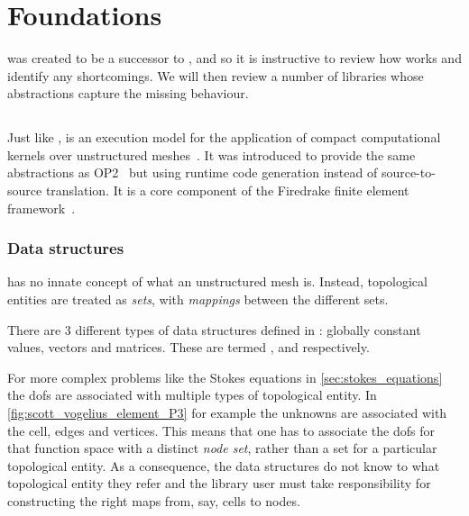 \documentclass[thesis]{subfiles}
\begin{document}
\chapter{Foundations}
\label{chapter:foundations}


 was created to be a successor to , and so it is instructive to review how  works and identify any shortcomings.
We will then review a number of libraries whose abstractions capture the missing behaviour.

\section{}

Just like ,  is an execution model for the application of compact computational kernels over unstructured meshes~\cite{rathgeberPyOP2HighLevelFramework2012}.
It was introduced to provide the same abstractions as OP2~\cite{mudaligeOP2ActiveLibrary2012} but using runtime code generation instead of source-to-source translation.
It is a core component of the Firedrake finite element framework~\cite{FiredrakeUserManual}.

\subsection{Data structures}

 has no innate concept of what an unstructured mesh is.
Instead, topological entities are treated as \textit{sets}, with \textit{mappings} between the different sets.

There are 3 different types of data structures defined in : globally constant values, vectors and matrices.
These are termed ,  and  respectively.

For more complex problems like the Stokes equations in \cref{sec:stokes_equations} the \glspl{dof} are associated with multiple types of topological entity.
In \cref{fig:scott_vogelius_element_P3} for example the unknowns are associated with the cell, edges and vertices.
This means that one has to associate the \glspl{dof} for that function space with a distinct \textit{node set}, rather than a set for a particular topological entity.
As a consequence, the data structures do not know to what topological entity they refer and the library user must take responsibility for constructing the right maps from, say, cells to nodes.
\end{document}
